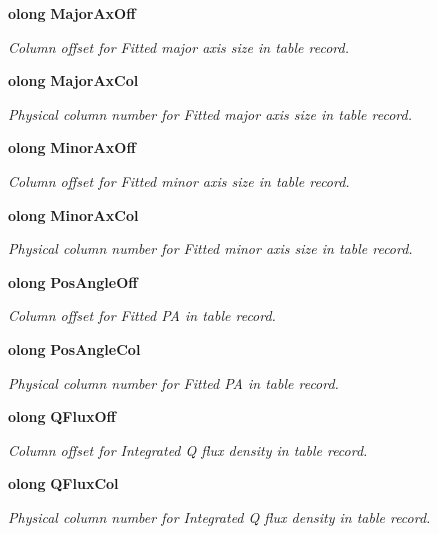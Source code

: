 \begin{CompactItemize}
{\bf olong} {\bf Major\-Ax\-Off}
\begin{CompactList}\small\item\em Column offset for Fitted major axis size in table record. \item\end{CompactList}\item 
{\bf olong} {\bf Major\-Ax\-Col}
\begin{CompactList}\small\item\em Physical column number for Fitted major axis size in table record. \item\end{CompactList}\item 
{\bf olong} {\bf Minor\-Ax\-Off}
\begin{CompactList}\small\item\em Column offset for Fitted minor axis size in table record. \item\end{CompactList}\item 
{\bf olong} {\bf Minor\-Ax\-Col}
\begin{CompactList}\small\item\em Physical column number for Fitted minor axis size in table record. \item\end{CompactList}\item 
{\bf olong} {\bf Pos\-Angle\-Off}
\begin{CompactList}\small\item\em Column offset for Fitted PA in table record. \item\end{CompactList}\item 
{\bf olong} {\bf Pos\-Angle\-Col}
\begin{CompactList}\small\item\em Physical column number for Fitted PA in table record. \item\end{CompactList}\item 
{\bf olong} {\bf QFlux\-Off}
\begin{CompactList}\small\item\em Column offset for Integrated Q flux density in table record. \item\end{CompactList}\item 
{\bf olong} {\bf QFlux\-Col}
\begin{CompactList}\small\item\em Physical column number for Integrated Q flux density in table record. \item\end{CompactList}\item 

\end{CompactItemize}
